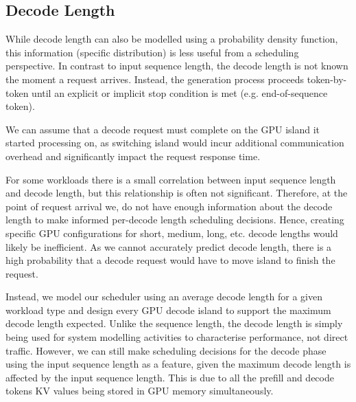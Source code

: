 
\subsection{Decode Length}
While decode length can also be modelled using a probability density function, this information (specific distribution) is less useful from a scheduling perspective.
In contrast to input sequence length, the decode length is not known the moment a request arrives.
Instead, the generation process proceeds token-by-token until an explicit or implicit stop condition is met (e.g. end-of-sequence token). %

We can assume that a decode request must complete on the GPU island it started processing on, as switching island would incur additional communication overhead and significantly impact the request response time. %

For some workloads there is a small correlation between input sequence length and decode length, but this relationship is often not significant. %
Therefore, at the point of request arrival we, do not have enough information about the decode length to make informed per-decode length scheduling decisions.
Hence, creating specific GPU configurations for short, medium, long, etc. decode lengths would likely be inefficient. 
As we cannot accurately predict decode length, there is a high probability that a decode request would have to move island to finish the request.


Instead, we model our scheduler using an average decode length for a given workload type and design every GPU decode island to support the maximum decode length expected. 
Unlike the sequence length, the decode length is simply being used for system modelling activities to characterise performance, not direct traffic.
However, we can still make scheduling decisions for the decode phase using the input sequence length as a feature, given the maximum decode length is affected by the input sequence length.
This is due to all the prefill and decode tokens KV values being stored in GPU memory simultaneously.
